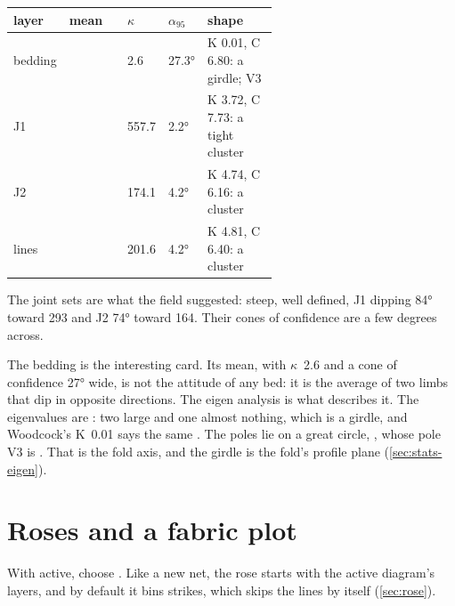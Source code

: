 \begin{center}\small
\begin{tabularx}{\linewidth}{@{}>{\raggedright}p{0.17\linewidth}>{\raggedright}p{0.22\linewidth}>{\raggedright}p{0.1\linewidth}>{\raggedright}p{0.1\linewidth}L@{}}\toprule
\sffamily\bfseries layer & \sffamily\bfseries mean & \sffamily\bfseries $\kappa$ & \sffamily\bfseries $\alpha_{95}$ & \sffamily\bfseries shape \\\midrule
bedding &  & 2.6 & 27.3° & K 0.01, C 6.80: a girdle; V3  \\
J1 &  & 557.7 & 2.2° & K 3.72, C 7.73: a tight cluster \\
J2 &  & 174.1 & 4.2° & K 4.74, C 6.16: a cluster \\
lines &  & 201.6 & 4.2° & K 4.81, C 6.40: a cluster \\
\bottomrule\end{tabularx}
\end{center}

The joint sets are what the field suggested: steep, well defined, J1 dipping 84° toward 293 and J2
74° toward 164. Their cones of confidence are a few degrees across.

The bedding is the interesting card. Its mean,  with $\kappa$~2.6 and a cone of
confidence 27° wide, is not the attitude of any bed: it is the average of two limbs that dip in
opposite directions. The eigen analysis is what describes it. The eigenvalues are
: two large and one almost nothing, which is a girdle, and Woodcock's
K~0.01 says the same \parencite{woodcock1977}. The poles lie on a great circle, ,
whose pole V3 is . That is the fold axis, and the girdle is the fold's profile plane
(\cref{sec:stats-eigen}).


\section{Roses and a fabric plot}\label{sec:wf-rose}

With  active, choose . Like a new net, the rose starts with the
active diagram's layers, and by default it bins strikes, which skips the lines by itself
(\cref{sec:rose}).

